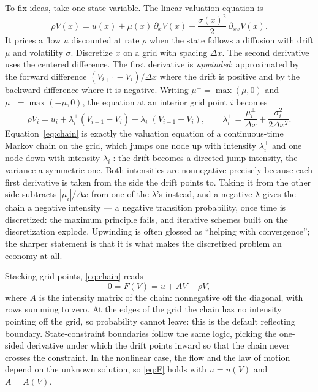 \documentclass[11pt]{article}
\numberwithin{equation}{section}
\begin{document}
	To fix ideas, take one state variable. The linear valuation equation is
	\begin{equation}\label{eq:linear}
		\rho V(x) = u(x) + \mu(x)\, \partial_x V(x) + \frac{\sigma(x)^2}{2}\, \partial_{xx} V(x).
	\end{equation}
	It prices a flow $u$ discounted at rate $\rho$ when the state follows a diffusion with drift $\mu$ and volatility $\sigma$. Discretize $x$ on a grid with spacing $\Delta x$. The second derivative uses the centered difference. The first derivative is \emph{upwinded}: approximated by the forward difference $(V_{i+1}-V_i)/\Delta x$ where the drift is positive and by the backward difference where it is negative. Writing $\mu^+ = \max(\mu, 0)$ and $\mu^- = \max(-\mu, 0)$, the equation at an interior grid point $i$ becomes
	\begin{equation}\label{eq:chain}
		\rho V_i = u_i + \lambda_i^{+}\left(V_{i+1}-V_i\right) + \lambda_i^{-}\left(V_{i-1}-V_i\right), \qquad \lambda_i^{\pm} = \frac{\mu_i^{\pm}}{\Delta x} + \frac{\sigma_i^2}{2\Delta x^2}.
	\end{equation}
	Equation~\eqref{eq:chain} is exactly the valuation equation of a continuous-time Markov chain on the grid, which jumps one node up with intensity $\lambda^+_i$ and one node down with intensity $\lambda^-_i$: the drift becomes a directed jump intensity, the variance a symmetric one. Both intensities are nonnegative precisely because each first derivative is taken from the side the drift points to. Taking it from the other side subtracts $|\mu_i|/\Delta x$ from one of the $\lambda$'s instead, and a negative $\lambda$ gives the chain a negative intensity --- a negative transition probability, once time is discretized: the maximum principle fails, and iterative schemes built on the discretization explode. Upwinding is often glossed as ``helping with convergence''; the sharper statement is that it is what makes the discretized problem an economy at all.

	Stacking grid points, \eqref{eq:chain} reads
	\begin{equation}\label{eq:F}
		0 = F(V) = u + A V - \rho V,
	\end{equation}
	where $A$ is the intensity matrix of the chain: nonnegative off the diagonal, with rows summing to zero. At the edges of the grid the chain has no intensity pointing off the grid, so probability cannot leave: this is the default reflecting boundary. State-constraint boundaries follow the same logic, picking the one-sided derivative under which the drift points inward so that the chain never crosses the constraint. In the nonlinear case, the flow and the law of motion depend on the unknown solution, so \eqref{eq:F} holds with $u = u(V)$ and $A = A(V)$.
\end{document}
